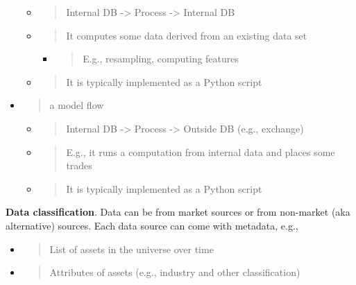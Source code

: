 \documentclass[11pt, reqno]{amsart}
\begin{document}
\begin{itemize}
  \begin{itemize}
  \item
    \begin{quote}
    Internal DB -\textgreater{} Process -\textgreater{} Internal DB
    \end{quote}
  \item
    \begin{quote}
    It computes some data derived from an existing data set
    \end{quote}

    \begin{itemize}
    \item
      \begin{quote}
      E.g., resampling, computing features
      \end{quote}
    \end{itemize}
  \item
    \begin{quote}
    It is typically implemented as a Python script
    \end{quote}
  \end{itemize}
\item
  \begin{quote}
  a model flow
  \end{quote}

  \begin{itemize}
  \item
    \begin{quote}
    Internal DB -\textgreater{} Process -\textgreater{} Outside DB
    (e.g., exchange)
    \end{quote}
  \item
    \begin{quote}
    E.g., it runs a computation from internal data and places some
    trades
    \end{quote}
  \item
    \begin{quote}
    It is typically implemented as a Python script
    \end{quote}
  \end{itemize}
\end{itemize}

\textbf{Data classification}. Data can be from market sources or from
non-market (aka alternative) sources. Each data source can come with
metadata, e.g.,

\begin{itemize}
\item
  \begin{quote}
  List of assets in the universe over time
  \end{quote}
\item
  \begin{quote}
  Attributes of assets (e.g., industry and other classification)
  \end{quote}
\end{itemize}
\end{document}
